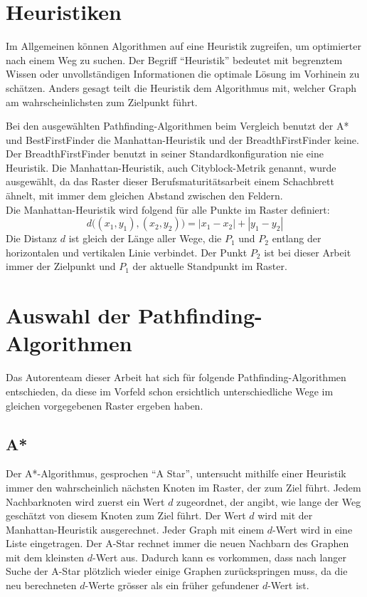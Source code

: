 
\section{Heuristiken}

Im Allgemeinen können Algorithmen auf eine Heuristik zugreifen, um
optimierter nach einem Weg zu suchen. Der Begriff ``Heuristik'' bedeutet
mit begrenztem Wissen oder unvollständigen Informationen die optimale
Lösung im Vorhinein zu schätzen. Anders gesagt teilt die Heuristik dem
Algorithmus mit, welcher Graph am wahrscheinlichsten zum Zielpunkt führt.

Bei den ausgewählten Pathfinding-Algorithmen beim Vergleich benutzt der A* und
BestFirstFinder die Manhattan-Heuristik und der BreadthFirstFinder
keine. Der BreadthFirstFinder benutzt in seiner Standardkonfiguration nie eine
Heuristik. Die Manhattan-Heuristik, auch Cityblock-Metrik genannt, wurde
ausgewählt, da das Raster dieser Berufsmaturitätsarbeit einem Schachbrett
ähnelt, mit immer dem gleichen Abstand zwischen den Feldern.\\
Die Manhattan-Heuristik wird folgend für alle Punkte im Raster definiert:
\begin{equation*}
d\big((x_1,y_1),(x_2,y_2)\big) = |x_1 - x_{2}| + |y_{1} - y_{2}|
\end{equation*}
Die Distanz $d$ ist gleich der Länge aller Wege, die $P_1$ und $P_2$ entlang der horizontalen und vertikalen Linie verbindet. Der Punkt $P_2$ ist bei dieser Arbeit immer der Zielpunkt und $P_1$ der
aktuelle Standpunkt im Raster. \cite[Patel, 2019]{heuristicsredblob}

\section{Auswahl der Pathfinding-Algorithmen}

Das Autorenteam dieser Arbeit hat sich für folgende Pathfinding-Algorithmen
entschieden, da diese im Vorfeld schon ersichtlich unterschiedliche
Wege im gleichen vorgegebenen Raster ergeben haben.

\subsection{A*}

Der A*-Algorithmus, gesprochen ``A Star'', untersucht mithilfe einer
Heuristik immer den wahrscheinlich nächsten Knoten im Raster, der zum
Ziel führt. Jedem Nachbarknoten wird zuerst ein Wert $d$ zugeordnet, der
angibt, wie lange der Weg geschätzt von diesem Knoten zum Ziel führt. Der Wert $d$
wird mit der Manhattan-Heuristik ausgerechnet. Jeder Graph mit einem $d$-Wert 
wird in eine Liste eingetragen. Der A-Star rechnet immer die neuen
Nachbarn des Graphen mit dem kleinsten $d$-Wert aus. Dadurch kann es
vorkommen, dass nach langer Suche der A-Star plötzlich wieder einige
Graphen zurückspringen muss, da die neu berechneten $d$-Werte grösser als
ein früher gefundener $d$-Wert ist.
\cite[Schmidt, Fuchs]{asterngeo}


